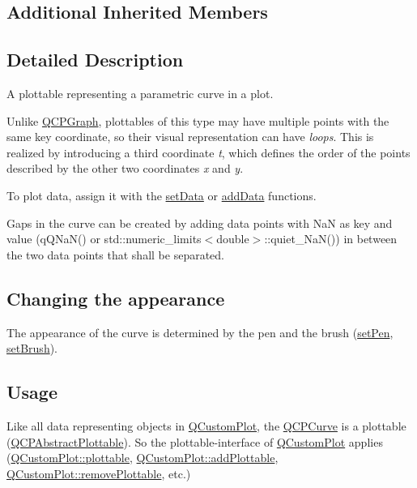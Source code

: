 \subsection*{Additional Inherited Members}


\subsection{Detailed Description}
A plottable representing a parametric curve in a plot. 



Unlike \hyperlink{classQCPGraph}{Q\+C\+P\+Graph}, plottables of this type may have multiple points with the same key coordinate, so their visual representation can have {\itshape loops}. This is realized by introducing a third coordinate {\itshape t}, which defines the order of the points described by the other two coordinates {\itshape x} and {\itshape y}.

To plot data, assign it with the \hyperlink{classQCPCurve_a631ac886708460013b30052f49cbc9da}{set\+Data} or \hyperlink{classQCPCurve_a4e24023c3b9ac75440c7a260172c99af}{add\+Data} functions.

Gaps in the curve can be created by adding data points with NaN as key and value ({\ttfamily q\+Q\+Na\+N()} or {\ttfamily std\+::numeric\+\_\+limits$<$double$>$\+::quiet\+\_\+\+Na\+N()}) in between the two data points that shall be separated.\hypertarget{classQCPStatisticalBox_appearance}{}\subsection{Changing the appearance}\label{classQCPStatisticalBox_appearance}
The appearance of the curve is determined by the pen and the brush (\hyperlink{classQCPAbstractPlottable_ab74b09ae4c0e7e13142fe4b5bf46cac7}{set\+Pen}, \hyperlink{classQCPAbstractPlottable_a7a4b92144dca6453a1f0f210e27edc74}{set\+Brush}). \hypertarget{classQCPStatisticalBox_usage}{}\subsection{Usage}\label{classQCPStatisticalBox_usage}
Like all data representing objects in \hyperlink{classQCustomPlot}{Q\+Custom\+Plot}, the \hyperlink{classQCPCurve}{Q\+C\+P\+Curve} is a plottable (\hyperlink{classQCPAbstractPlottable}{Q\+C\+P\+Abstract\+Plottable}). So the plottable-\/interface of \hyperlink{classQCustomPlot}{Q\+Custom\+Plot} applies (\hyperlink{classQCustomPlot_a32de81ff53e263e785b83b52ecd99d6f}{Q\+Custom\+Plot\+::plottable}, \hyperlink{classQCustomPlot_ab7ad9174f701f9c6f64e378df77927a6}{Q\+Custom\+Plot\+::add\+Plottable}, \hyperlink{classQCustomPlot_af3dafd56884208474f311d6226513ab2}{Q\+Custom\+Plot\+::remove\+Plottable}, etc.)


